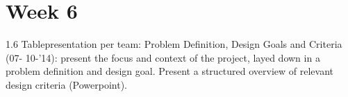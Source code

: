 \documentclass[final]{scrreprt} %
\begin{document}
\chapter{Week 6}
1.6 Tablepresentation per team: Problem Definition, Design Goals and Criteria (07-
10-’14): present the focus and context of the project, layed down in a problem 
definition and design goal. Present a structured overview of relevant design 
criteria (Powerpoint).
\end{document}
